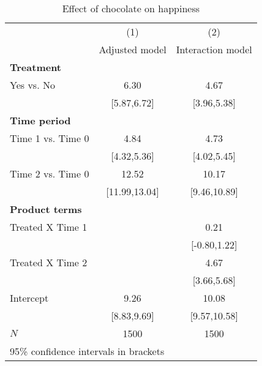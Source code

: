 \begin{table}[htbp]\centering
\caption{Effect of chocolate on happiness}
\begin{tabular}{l*{2}{c}}
\hline\hline
            &\multicolumn{1}{c}{(1)}&\multicolumn{1}{c}{(2)}\\
            &\multicolumn{1}{c}{Adjusted model}&\multicolumn{1}{c}{Interaction model}\\
\hline
\textbf{Treatment}&                      &                      \\
[1em]
Yes vs. No  &                  6.30&                  4.67\\
            &           [5.87,6.72]&           [3.96,5.38]\\
[1em]
\textbf{Time period}&                      &                      \\
[1em]
Time 1 vs. Time 0&                  4.84&                  4.73\\
            &           [4.32,5.36]&           [4.02,5.45]\\
[1em]
Time 2 vs. Time 0&                 12.52&                 10.17\\
            &         [11.99,13.04]&          [9.46,10.89]\\
[1em]
\textbf{Product terms}&                      &                      \\
[1em]
Treated X Time 1&                      &                  0.21\\
            &                      &          [-0.80,1.22]\\
[1em]
Treated X Time 2&                      &                  4.67\\
            &                      &           [3.66,5.68]\\
[1em]
Intercept   &                  9.26&                 10.08\\
            &           [8.83,9.69]&          [9.57,10.58]\\
\hline
\(N\)       &                  1500&                  1500\\
\hline\hline
\multicolumn{3}{l}{\footnotesize 95\% confidence intervals in brackets}\\
\end{tabular}
\end{table}
